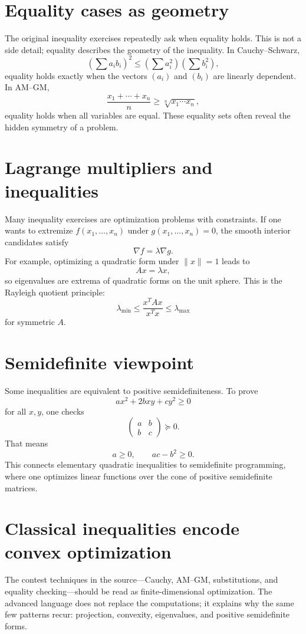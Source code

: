 \section{Equality cases as geometry}

The original inequality exercises repeatedly ask when equality holds.  This is not a side detail; equality describes the geometry of the inequality.  In Cauchy--Schwarz,
\[
  \left(\sum a_ib_i\right)^2\le \left(\sum a_i^2\right)\left(\sum b_i^2\right),
\]
equality holds exactly when the vectors $(a_i)$ and $(b_i)$ are linearly dependent.  In AM--GM,
\[
  \frac{x_1+\cdots+x_n}{n}\ge \sqrt[n]{x_1\cdots x_n},
\]
equality holds when all variables are equal.  These equality sets often reveal the hidden symmetry of a problem.

\section{Lagrange multipliers and inequalities}

Many inequality exercises are optimization problems with constraints.  If one wants to extremize $f(x_1,\ldots,x_n)$ under $g(x_1,\ldots,x_n)=0$, the smooth interior candidates satisfy
\[
  \nabla f=\lambda \nabla g.
\]
For example, optimizing a quadratic form under $\|x\|=1$ leads to
\[
  Ax=\lambda x,
\]
so eigenvalues are extrema of quadratic forms on the unit sphere.  This is the Rayleigh quotient principle:
\[
  \lambda_{\min}\le \frac{x^TAx}{x^Tx}\le \lambda_{\max}
\]
for symmetric $A$.

\section{Semidefinite viewpoint}

Some inequalities are equivalent to positive semidefiniteness.  To prove
\[
  ax^2+2bxy+cy^2\ge0
\]
for all $x,y$, one checks
\[
  \begin{pmatrix}a&b\\b&c\end{pmatrix}\succeq0.
\]
That means
\[
  a\ge0,\qquad ac-b^2\ge0.
\]
This connects elementary quadratic inequalities to semidefinite programming, where one optimizes linear functions over the cone of positive semidefinite matrices.

\section{Classical inequalities encode convex optimization}

The contest techniques in the source—Cauchy, AM--GM, substitutions, and equality checking—should be read as finite-dimensional optimization.  The advanced language does not replace the computations; it explains why the same few patterns recur: projection, convexity, eigenvalues, and positive semidefinite forms.
